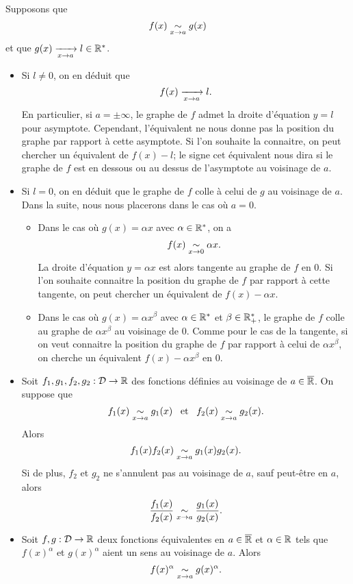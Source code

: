 \documentclass{magnoliaold}
\begin{document}
\begin{remarqueUnique}
\remarque Supposons que 
  \[f(x)\underset{x\rightarrow a}{\sim} g(x)\]
  et que $g(x)\xrightarrow[x\rightarrow a]{} l\in{\mathbb{R}^*}$.
  \begin{itemize}
  \item Si $l\neq 0$, on en déduit que
    \[f(x)\xrightarrow[x\rightarrow a]{} l.\]
    En particulier, si $a=\pm\infty$, le graphe de $f$ admet la droite d'équation $y=l$
    pour asymptote. Cependant, l'équivalent ne nous donne pas la position du graphe
    par rapport à cette asymptote. Si l'on souhaite la connaitre, on peut chercher
    un équivalent de $f(x)-l$; le signe cet équivalent nous dira si le graphe de $f$
    est en dessous ou au dessus de l'asymptote au voisinage de $a$.
  \item Si $l=0$, on en déduit que le graphe de $f$ \og colle \fg à celui de $g$ au voisinage
    de $a$. Dans la suite, nous nous placerons dans le cas où $a=0$.
    \begin{itemize}
    \item Dans le cas où $g(x)=\alpha x$ avec $\alpha\in{\mathbb{R}^*}$, on a
      \[f(x)\underset{x\rightarrow 0}{\sim} \alpha x.\]
      La droite d'équation $y=\alpha x$ est alors tangente au graphe de $f$ en 0.
      Si l'on souhaite connaitre la position du graphe de $f$ par rapport à cette
      tangente, on peut chercher un équivalent de $f(x)-\alpha x$.
    \item Dans le cas où $g(x)=\alpha x^{\beta}$ avec $\alpha\in{\mathbb{R}^*}$ et $\beta\in\mathbb{R}_+^*$,
      le graphe de $f$ \og colle \fg au graphe de $\alpha x^\beta$ au voisinage de 0.
      Comme pour le cas de la tangente, si on veut connaitre la position du graphe
      de $f$ par rapport à celui de $\alpha x^\beta$, on cherche un équivalent
      $f(x)-\alpha x^\beta$ en 0.
    \end{itemize}
  \end{itemize}
\end{remarqueUnique}

\begin{proposition}[utile=-3]
\begin{itemize}
\item Soit $f_1,g_1,f_2,g_2:\mathcal{D}\to\mathbb{R}$ des fonctions définies au voisinage de $a\in\overline{\mathbb{R}}$.
  On suppose que
  \[f_1(x)\underset{x\rightarrow a}{\sim} g_1(x) \quad\!\text{et}\quad\! f_2(x)\underset{x\rightarrow a}{\sim} g_2(x).\]
  Alors
  \[f_1(x)f_2(x) \underset{x\rightarrow a}{\sim} g_1(x)g_2(x).\]
  Si de plus, $f_2$ et $g_2$ ne s'annulent pas au voisinage de $a$, sauf peut-être en $a$, alors
  \[\frac{f_1(x)}{f_2(x)} \underset{x\rightarrow a}{\sim} \frac{g_1(x)}{g_2(x)}.\]
\item Soit $f,g:\mathcal{D}\to\mathbb{R}$ deux fonctions équivalentes en $a\in\overline{\mathbb{R}}$ et
  $\alpha\in\mathbb{R}$ tels que $f(x)^\alpha$ et $g(x)^\alpha$ aient un sens au
  voisinage de $a$. Alors
  \[f(x)^\alpha \underset{x\rightarrow a}{\sim} g(x)^{\alpha}.\]
\end{itemize}
\end{proposition}
\end{document}

